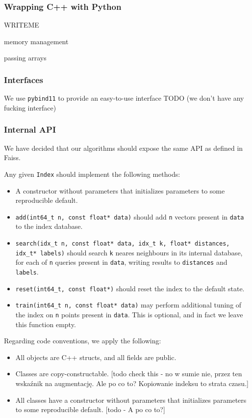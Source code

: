 \subsubsection{Wrapping C++ with Python}

WRITEME

memory management

passing arrays

\subsubsection{Interfaces}

We use \texttt{pybind11} to provide an easy-to-use interface
TODO (we don't have any fucking interface)

\subsubsection{Internal API}

We have decided that our algorithms should expose the same API as defined in Faiss.

Any given \texttt{Index} should implement the following methods:
\begin{itemize}

\item A constructor without parameters that initializes parameters to some reproducible default.

\item \texttt{add(int64\_t n, const float* data)} 
should add \texttt{n} vectors present in \texttt{data} to the index database.

\item \texttt{search(idx\_t n, const float* data, idx\_t k, float* distances, idx\_t* labels)} 
should search \texttt{k} neares neighbours 
in its internal database, for each of \texttt{n} queries present in \texttt{data}, writing results to \texttt{distances} and \texttt{labels}.

\item \texttt{reset(int64\_t, const float*)} 
should reset the index to the default state.

\item \texttt{train(int64\_t n, const float* data)} 
may perform additional tuning of the index on \texttt{n} points present in \texttt{data}. This is
optional, and in fact we leave this function empty.

\end{itemize}

Regarding code conventions, we apply the following:

\begin{itemize}
\item All objects are C++ structs, and all fields are public.
\item Classes are copy-constructable. [todo check this - no w sumie nie, przez ten wskaźnik na augmentację. Ale po co to? Kopiowanie indeksu to strata czasu.]
\item All classes have a constructor without parameters that initializes parameters to some reproducible default. [todo - A po co to?]
\end{itemize}
